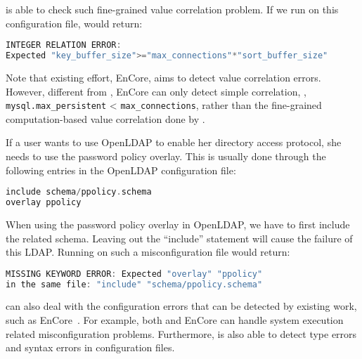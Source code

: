 \app is able to check such fine-grained value correlation problem.
If we run \app on this configuration file, \app  would return:

\begin{lstlisting}[language=C]
INTEGER RELATION ERROR:
Expected "key_buffer_size">="max_connections"*"sort_buffer_size"
\end{lstlisting} 

Note that existing effort, EnCore, aims to detect value correlation 
errors. However, different from \app, EnCore can only detect simple
correlation, \eg, {\tt mysql.max\_persistent} < {\tt max\_connections},
rather than the fine-grained computation-based value correlation
done by \app.

If a user wants to use OpenLDAP to enable her directory access
protocol, she needs to use the password policy overlay. This is usually
done through the following entries in the OpenLDAP configuration file:

\begin{lstlisting}[language=C]
include schema/ppolicy.schema
overlay ppolicy
\end{lstlisting} 

When using the password policy overlay in OpenLDAP, 
we have to first include the related schema.
Leaving out the ``include'' statement will cause the failure of 
this LDAP. Running \app on such a misconfiguration file would return:

\begin{lstlisting}[language=C]
MISSING KEYWORD ERROR: Expected "overlay" "ppolicy"
in the same file: "include" "schema/ppolicy.schema"
\end{lstlisting} 


\app can also deal with the configuration errors that can be detected by
existing work, such as EnCore~\cite{zhang14encore}.
For example, both \app and EnCore can handle system execution related
misconfiguration problems.
Furthermore, \app is also able to detect type errors and syntax errors
in configuration files.
